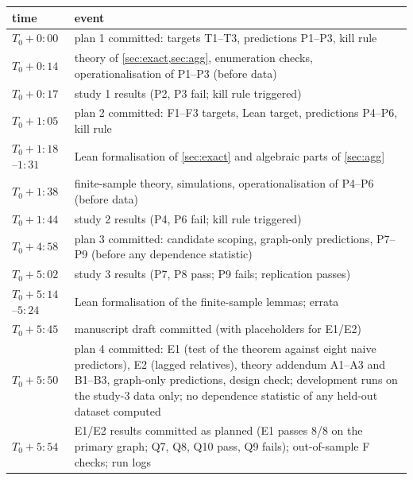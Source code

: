 \begin{center}\small
\begin{tabular}{p{}p{}}
\toprule
time & event \\
\midrule
$T_0+0{:}00$ & plan 1 committed: targets T1--T3, predictions P1--P3, kill rule \\
$T_0+0{:}14$ & theory of \cref{sec:exact,sec:agg}, enumeration checks, operationalisation of P1--P3 (before data) \\
$T_0+0{:}17$ & study 1 results (P2, P3 fail; kill rule triggered) \\
$T_0+1{:}05$ & plan 2 committed: F1--F3 targets, Lean target, predictions P4--P6, kill rule \\
$T_0+1{:}18$--$1{:}31$ & Lean formalisation of \cref{sec:exact} and algebraic parts of \cref{sec:agg} \\
$T_0+1{:}38$ & finite-sample theory, simulations, operationalisation of P4--P6 (before data) \\
$T_0+1{:}44$ & study 2 results (P4, P6 fail; kill rule triggered) \\
$T_0+4{:}58$ & plan 3 committed: candidate scoping, graph-only predictions, P7--P9 (before any dependence statistic) \\
$T_0+5{:}02$ & study 3 results (P7, P8 pass; P9 fails; replication passes) \\
$T_0+5{:}14$--$5{:}24$ & Lean formalisation of the finite-sample lemmas; errata \\
$T_0+5{:}45$ & manuscript draft committed (with placeholders for E1/E2) \\
$T_0+5{:}50$ & plan 4 committed: E1 (test of the theorem against eight naive predictors), E2 (lagged relatives), theory addendum A1--A3 and B1--B3, graph-only predictions, design check; development runs on the study-3 data only; no dependence statistic of any held-out dataset computed \\
$T_0+5{:}54$ & E1/E2 results committed as planned (E1 passes 8/8 on the primary graph; Q7, Q8, Q10 pass, Q9 fails); out-of-sample F checks; run logs \\
\bottomrule
\end{tabular}
\end{center}

